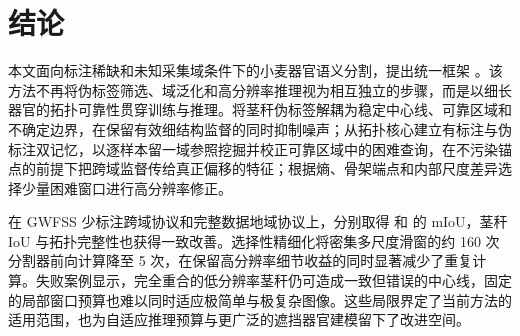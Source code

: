 \section{结论}
\label{sec:conclusion}

本文面向标注稀缺和未知采集域条件下的小麦器官语义分割，提出统一框架 \METHOD。该方法不再将伪标签筛选、域泛化和高分辨率推理视为相互独立的步骤，而是以细长器官的拓扑可靠性贯穿训练与推理。\TRPL 将茎秆伪标签解耦为稳定中心线、可靠区域和不确定边界，在保留有效细结构监督的同时抑制噪声；\TCPM 从拓扑核心建立有标注与伪标注双记忆，以逐样本留一域参照挖掘并校正可靠区域中的困难查询，在不污染锚点的前提下把跨域监督传给真正偏移的特征；\BAZR 根据熵、骨架端点和内部尺度差异选择少量困难窗口进行高分辨率修正。

在 GWFSS 少标注跨域协议和完整数据地域协议上，\METHOD 分别取得  和  的 mIoU，茎秆 IoU 与拓扑完整性也获得一致改善。选择性精细化将密集多尺度滑窗的约 160 次分割器前向计算降至 5 次，在保留高分辨率细节收益的同时显著减少了重复计算。失败案例显示，完全重合的低分辨率茎秆仍可造成一致但错误的中心线，固定的局部窗口预算也难以同时适应极简单与极复杂图像。这些局限界定了当前方法的适用范围，也为自适应推理预算与更广泛的遮挡器官建模留下了改进空间。
